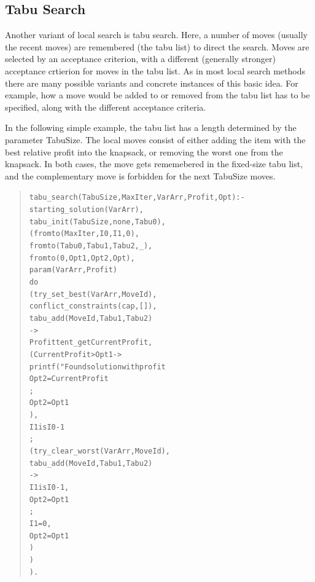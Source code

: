 \newpage
\subsection{Tabu Search}
Another variant of local search is tabu search.  Here, a number of moves
(usually the recent moves) are remembered (the tabu list) to direct the
search. Moves are selected by an acceptance criterion, with a 
different (generally stronger) acceptance crtierion for moves in the tabu
list.  As in most local search methods there are many possible variants and
concrete instances of this basic idea. For example, how a move would be
added to or removed from the tabu list has to be specified, along with the
different acceptance criteria.

In the following simple example, the tabu list has a length determined by
the parameter TabuSize. The local moves consist of either adding
the item with the best relative profit into the knapsack, or removing
the worst one from the knapsack. In both cases, the move gets rememebered
in the fixed-size tabu list, and the complementary move is forbidden
for the next TabuSize moves.
\begin{quote}\begin{alltt}
tabu_search(TabuSize, MaxIter, VarArr, Profit, Opt) :-
        starting_solution(VarArr),              %
        tabu_init(TabuSize, none, Tabu0),
        (   fromto(MaxIter, I0, I1, 0),
            fromto(Tabu0, Tabu1, Tabu2, _),
            fromto(0, Opt1, Opt2, Opt),
            param(VarArr,Profit)
        do
            (   try_set_best(VarArr, MoveId),   %
                conflict_constraints(cap,[]),   %
                tabu_add(MoveId, Tabu1, Tabu2)  %
            ->
                Profit tent_get CurrentProfit,
                ( CurrentProfit > Opt1 ->       %
                    printf("Found solution with profit %
                    Opt2=CurrentProfit          %
                ;
                    Opt2=Opt1                   %
                ),
                I1 is I0-1
            ;
                (   try_clear_worst(VarArr, MoveId),    %
                    tabu_add(MoveId, Tabu1, Tabu2)      %
                ->
                    I1 is I0-1,
                    Opt2=Opt1                   %
                ;
                    I1=0,                       %
                    Opt2=Opt1                   %
                )
            )
        ).
\end{alltt}\end{quote}

